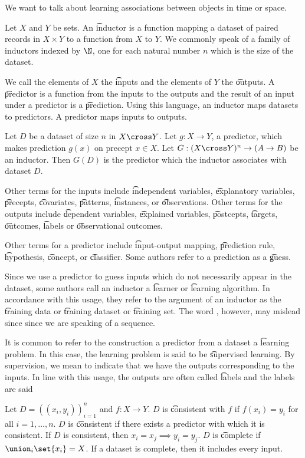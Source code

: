 

We want to talk about learning associations between objects in time or space.


Let $X$ and $Y$ be sets.
An \t{inductor} is a function mapping a dataset of paired records in $X \times Y$ to a function from $X$ to $Y$.
We commonly speak of a family of inductors indexed by $\N$, one for each natural number $n$ which is the size of the dataset.

We call the elements of $X$ the \t{inputs} and the elements of $Y$ the \t{outputs}.
A \t{predictor} is a function from the inputs to the outputs and the result of an input under a predictor is a \t{prediction}.
Using this language, an inductor maps datasets to predictors.
A predictor maps inputs to outputs.


Let $D$ be a dataset of size $n$ in $X \cross Y$.
Let $g: X \to Y$, a predictor, which makes prediction $g(x)$ on precept $x \in X$.
Let $G: (X \cross Y)^n \to (A \to B)$ be an inductor.
Then $G(D)$ is the predictor which the inductor associates with dataset $D$.


Other terms for the inputs include \t{independent variables}, \t{explanatory variables}, \t{precepts}, \t{covariates}, \t{patterns}, \t{instances}, or \t{observations}.
Other terms for the outputs include \t{dependent variables}, \t{explained variables}, \t{postcepts}, \t{targets}, \t{outcomes}, \t{labels} or \t{observational outcomes}.

Other terms for a predictor include \t{input-output} mapping, \t{prediction rule}, \t{hypothesis}, \t{concept}, or \t{classifier}.
Some authors refer to a prediction as a \t{guess}.


Since we use a predictor to guess inputs which do not necessarily appear in the dataset, some authors call an inductor a \t{learner} or \t{learning algorithm}.
In accordance with this usage, they refer to the argument of an inductor as the \t{training data} or \t{training dataset} or \t{training set}.
The word , however, may mislead since since we are speaking of a sequence.

It is common to refer to the construction a predictor from a dataset a \t{learning problem}.
In this case, the learning problem is said to be \t{supervised learning}.
By supervision, we mean to indicate that we have the outputs corresponding to the inputs.
In line with this usage, the outputs are often called \t{labels} and the labels are said 


Let $D = ((x_i, y_i))_{i =1}^{n}$ and $f: X \to Y$.
$D$ is \t{consistent with $f$} if $f(x_i) = y_i$ for all $i = 1, \dots, n$.
$D$ is \t{consistent} if there exists a predictor with which it is consistent.
If $D$ is consistent, then $x_i = x_j \implies y_i = y_j$.
$D$ is \t{complete} if $\union_i\set{x_i} = X$.
If a dataset is complete, then it includes every input.
